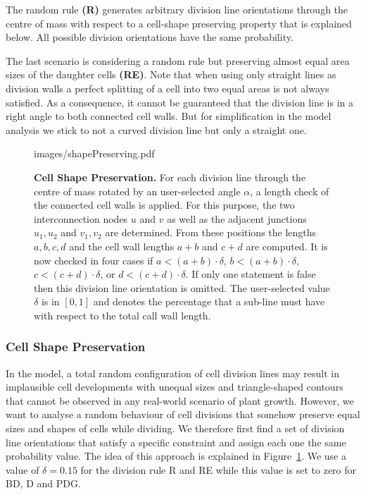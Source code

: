\documentclass[11pt,a4paper, final]{article}
\begin{document}
The random rule \textbf{(R)} generates arbitrary division line orientations through the centre of mass with respect to a cell-shape preserving property that is explained below. All possible division orientations have the same probability.

The last scenario is considering a random rule but preserving almost equal area sizes of the daughter cells \textbf{(RE)}. Note that when using only straight lines as division walls a perfect splitting of a cell into two equal areas is not always satisfied. As a consequence, it cannot be guaranteed that the division line is in a right angle to both connected cell walls. But for simplification in the model analysis we stick to not a curved division line but only a straight one.

%
\begin{figure}[htbp]
	\begin{center}
		\begin{overpic}[width=0.8\linewidth]{images/shapePreserving.pdf}
		\end{overpic}
\caption[Cell Shape Preservation.]
{
{\bf Cell Shape Preservation.} For each division line through the centre of mass rotated by an user-selected angle $\alpha$, a length check of the connected cell walls is applied. For this purpose, the two interconnection nodes $u$ and $v$ as well as the adjacent junctions $u_1, u_2$ and $v_1, v_2$ are determined. From these positions the lengths $a, b, c, d$ and the cell wall lengths $a+b$ and $c+d$ are computed. It is now checked in four cases if $a < (a+b)\cdot \delta$, $b < (a+b)\cdot \delta$, $c < (c+d)\cdot \delta$, or $d < (c+d)\cdot \delta$. If only one statement is false then this division line orientation is omitted. The user-selected value $\delta$ is in $[0,1]$ and denotes the percentage that a sub-line must have with respect to the total call wall length.
}
	\label{fig:shapePreserving}
	\end{center}
\end{figure}
%

\subsubsection{Cell Shape Preservation}
\noindent
In the model, a total random configuration of cell division lines may result in implausible cell developments with unequal sizes and triangle-shaped contours that cannot be observed in any real-world scenario of plant growth. However, we want to analyse a random behaviour of cell divisions that somehow preserve equal sizes and shapes of cells while dividing. We therefore first find a set of division line orientations that satisfy a specific constraint and assign each one the same probability value. The idea of this approach is explained in Figure~\ref{fig:shapePreserving}. We use a value of $\delta = 0.15$ for the division rule R and RE while this value is set to zero for BD, D and PDG.
\end{document}
